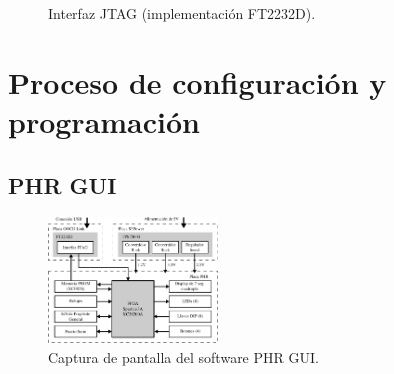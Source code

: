 \documentclass[conference]{IEEEtran}
\begin{document}
\begin{figure}[!t]
  \centerline{
  \hfil
  \hfil
  }
  \caption{Interfaz JTAG (implementación FT2232D).}
  \label{fig:oocdlink}
\end{figure}

\section{Proceso de configuración y programación}

\lipsum[50-53]

\subsection{PHR GUI}

\lipsum[55-58]

\begin{figure}[!t]
\centering
  \includegraphics[width=0.4\textwidth]{img/block}
  \caption{Captura de pantalla del software PHR GUI.}
  \label{fig:flujo-hdl}
\end{figure}
\end{document}
